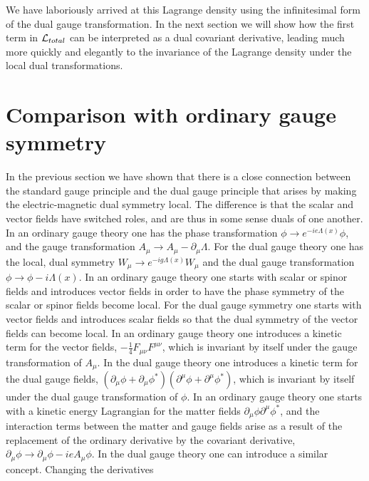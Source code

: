 \documentclass[a4paper,aps]{revtex4}
\begin{document}
We have laboriously arrived at this Lagrange density
using the infinitesimal form of the dual gauge transformation.
In the next section we will show how the first term in
${\cal L} _{total}$ can be interpreted as a dual covariant
derivative, leading much more quickly
and elegantly to the invariance of the Lagrange density under the
local dual transformations.

\section{Comparison with ordinary gauge symmetry}

In the previous section we have shown that there is a close
connection between the standard gauge principle and the
dual gauge principle that arises by making the electric-magnetic
dual symmetry local. The difference is that the scalar and vector
fields have switched roles, and are thus in some sense duals
of one another. In an ordinary
gauge theory one has the phase transformation
$\phi \rightarrow e^{-i e \Lambda (x)} \phi$,
and the gauge transformation $A_{\mu} \rightarrow A_{\mu}
- \partial _{\mu} \Lambda$. For the dual gauge theory one
has the local, dual symmetry $W_{\mu} \rightarrow e^{-i g \Lambda (x)}
W_{\mu}$ and the dual gauge transformation $\phi \rightarrow \phi
-i \Lambda (x)$. In an ordinary gauge theory one starts
with scalar or spinor fields and introduces vector fields in
order to have the phase symmetry of the scalar or
spinor fields become local. For the dual gauge
symmetry one starts with vector fields and introduces 
scalar fields so that the dual symmetry of the vector fields
can become local. In an ordinary gauge theory one introduces
a kinetic term for the vector fields, $-\frac{1}{4} F_{\mu\nu}
F^{\mu \nu}$, which is invariant by itself under the gauge transformation
of $A_{\mu}$. In the dual gauge theory one introduces a kinetic
term for the dual gauge fields, $(\partial _{\mu} \phi
+ \partial _{\mu} \phi ^{\ast})( \partial ^{\mu} \phi
+\partial ^{\mu} \phi ^{\ast})$, which is invariant by itself
under the dual gauge transformation of $\phi$.
In an ordinary gauge theory one starts with
a kinetic energy Lagrangian for the matter fields
$\partial _{\mu} \phi \partial ^{\mu} \phi ^{\ast}$, and the
interaction terms between the matter and gauge fields arise as
a result of the replacement of the ordinary derivative by the
covariant derivative, $\partial _{\mu} \phi \rightarrow
\partial _{\mu} \phi - ie A_{\mu} \phi$. In the dual gauge theory
one can introduce a similar concept. Changing the derivatives
\end{document}
